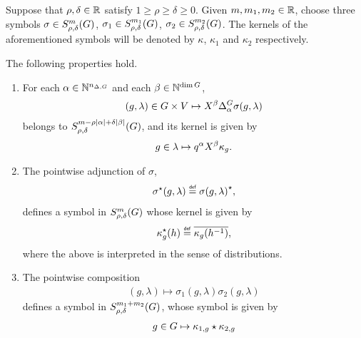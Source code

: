 \begin{proposition}
\label{proposition:first_properties_of_symbol_classes}
    Suppose that $\rho, \delta \in \mathbb{R}$ satisfy $1 \geq \rho \geq \delta \geq 0$.
    Given $m, m_1, m_2 \in \mathbb{R}$,
    choose three symbols $\sigma \in S^{m}_{\rho, \delta}(G)$,
    $\sigma_1 \in S^{m_1}_{\rho, \delta}(G)$,
    $\sigma_2 \in S^{m_2}_{\rho, \delta}(G)$.
    The kernels of the aforementioned symbols will be denoted by
    $\kappa$, $\kappa_1$ and $\kappa_2$ respectively.

    The following properties hold.
    \begin{enumerate}
        \item For each $\alpha \in \mathbb{N}^{n_{\Delta, G}}$ and each $\beta \in \mathbb{N}^{\dim G}$,
            \begin{align*}
                (g, \lambda) \in \Group \times \VectorSpace \mapsto
                \LeftDifferentialOperator \beta \DifferenceOperator \alpha \sigma(g, \lambda)
            \end{align*}
            belongs to $S^{m - \rho \left|{\alpha}\right| + \delta \left|{\beta}\right|}_{\rho, \delta}(G)$,
            and its kernel is given by
            \begin{align*}
                g \in \lambda \mapsto q^\alpha \LeftDifferentialOperator \beta \kappa_g.
            \end{align*}
        \item The pointwise adjunction of $\sigma$,
            \begin{align*}
                \adj \sigma(g, \lambda) \defeq \adj {\sigma(g, \lambda)},
            \end{align*}
            defines a symbol in $S^{m}_{\rho, \delta}(G)$ whose kernel is given by
            \begin{align*}
                \adj \kappa_g(h) \defeq \conj {\kappa_g(h^{-1})},
            \end{align*}
            where the above is interpreted in the sense of distributions.
        \item
            \label{item:properties_of_symbols:pointwise_composition}
            The pointwise composition
            \begin{align*}
                (g, \lambda) \mapsto \sigma_1(g, \lambda) \sigma_2(g, \lambda)
            \end{align*}
            defines a symbol in $S^{m_1 + m_2}_{\rho, \delta}(G)$,
            whose symbol is given by
            \begin{align*}
                g \in G \mapsto \kappa_{1, g} \star \kappa_{2, g}
            \end{align*}
    \end{enumerate}
\end{proposition}

